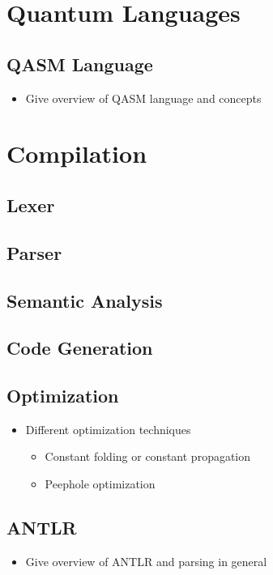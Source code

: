 \section{Quantum Languages}

\subsection{QASM Language}
\begin{itemize}
    \item Give overview of QASM language and concepts
\end{itemize}

\section{Compilation}

\subsection{Lexer}

\subsection{Parser}

\subsection{Semantic Analysis}

\subsection{Code Generation}

\subsection{Optimization}
\begin{itemize}
    \item Different optimization techniques
    \begin{itemize}
        \item Constant folding or constant propagation
        \item Peephole optimization
    \end{itemize}
\end{itemize}

\subsection{ANTLR}
\begin{itemize}
    \item Give overview of ANTLR and parsing in general
\end{itemize}